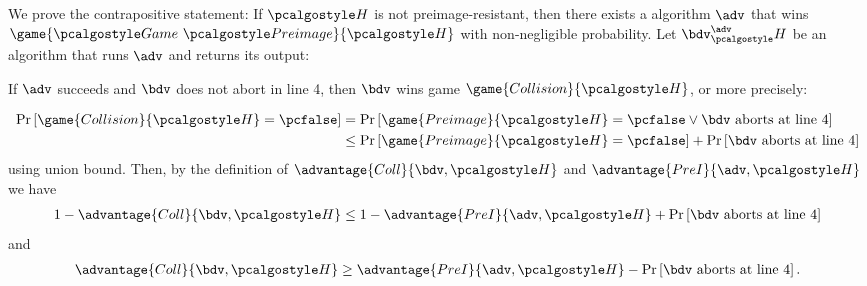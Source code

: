 \ifsolutions
\begin{mysolution}
  We prove the contrapositive statement:
  If $\algo{H}$ is not preimage-resistant, then there exists a \ppt algorithm $\adv$ that wins $\game{\Game~\algo{Preimage}}{\algo{H}}$ with non-negligible probability.
  Let $\bdv^\adv_\algo{H}$ be an algorithm that runs $\adv$ and returns its output:
  
  \begin{center}
    \begin{tcolorbox}[width=4cm]
      \begin{pchstack}[center]
      \end{pchstack}
    \end{tcolorbox}
  \end{center}
  
  If $\adv$ succeeds and $\bdv$ does not abort in line 4, then $\bdv$ wins game $\game{Collision}{\algo{H}}$, or more precisely:

  \begin{align*}
  \pr{\game{Collision}{\algo{H}} = \pcfalse} &= \pr{\game{Preimage}{\algo{H}} = \pcfalse \vee \bdv \text{ aborts at line 4} } \\
  &\le \pr{\game{Preimage}{\algo{H}} = \pcfalse} + \pr{\bdv \text{ aborts at line 4} } \\
  \end{align*}
  using union bound.
  Then, by the definition of $\advantage{Coll}{\bdv, \algo{H}}$ and $\advantage{PreI}{\adv, \algo{H}}$ we have
  \begin{align*}
    1 - \advantage{Coll}{\bdv, \algo{H}} &\le 1 - \advantage{PreI}{\adv, \algo{H}} + \pr{\bdv \text{ aborts at line 4} }\\
  \end{align*}
  and
  \begin{align*}
    \advantage{Coll}{\bdv, \algo{H}} &\ge \advantage{PreI}{\adv, \algo{H}} - \pr{\bdv \text{ aborts at line 4} }.\\
  \end{align*}
  

\end{mysolution}
